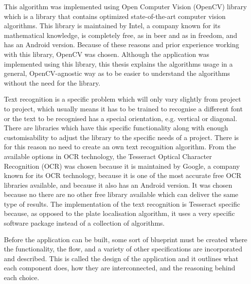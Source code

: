 This algorithm was implemented using Open Computer Vision (OpenCV) library which is a library that contains optimized state-of-the-art computer vision algorithms. This library is maintained by Intel, a company known for its mathematical knowledge, is completely free, as in beer and as in freedom, and has an Android version. Because of these reasons and prior experience working with this library, OpenCV was chosen. Although the application was implemented using this library, this thesis explains the algorithms usage in a general, OpenCV-agnostic way as to be easier to understand the algorithms without the need for the library.



Text recognition is a specific problem which will only vary slightly from project to project, which usually means it has to be trained to recognise a different font or the text to be recognised has a special orientation, e.g. vertical or diagonal. There are libraries which have this specific functionality along with enough customisability to adjust the library to the specific needs of a project. There is for this reason no need to create an own text recognition algorithm.
From the available options in OCR technology, the Tesseract Optical Character Recognition (OCR) was chosen because it is maintained by Google, a company known for its OCR technology, because it is one of the most accurate free OCR libraries available, and because it also has an Android version. It was chosen because no there are no other free library available which can deliver the same type of results. The implementation of the text recognition is Tesseract specific because, as opposed to the plate localisation algorithm, it uses a very specific software package instead of a collection of algorithms.




Before the application can be built, some sort of blueprint must be created where the functionality, the flow, and a variety of other specifications are incorporated and described. This is called the design of the application and it outlines what each component does, how they are interconnected, and the reasoning behind each choice.

